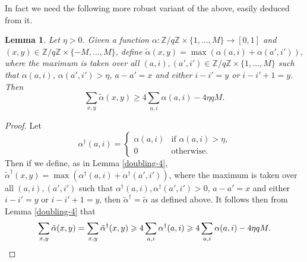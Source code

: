 \documentclass[10pt,reqno]{amsart}
\newtheorem{lemma}[theorem]{Lemma}
\theoremstyle{definition}
\theoremstyle{remark}
\renewcommand{\geq}{\geqslant}
\def\Z{\mathbb{Z}}
\numberwithin{equation}{section}
\begin{document}
In fact we need the following more robust variant of the above, easily deduced from it.

\begin{lemma}\label{doubling-4-witheps}
Let $\eta>0$. Given a function $\alpha : \Z/q\Z \times\{1,\dots,M\} \to [0,1]$ and $(x,y) \in \Z/q\Z\times \{-M,\dots, M\}$, define $\tilde \alpha(x,y) = \max (\alpha(a,i) + \alpha(a',i'))$, where the maximum is taken over all $(a,i), (a',i')\in\Z/q\Z\times\{1,\dots,M\}$ such that $\alpha(a,i)$, $\alpha(a',i')>\eta$, $a-a' = x$ and either $i-i' = y$ or $i - i' + 1 = y$. Then
\[ \sum_{x,y} \tilde \alpha(x,y) \geq 4 \sum_{a,i} \alpha(a,i) - 4\eta qM.\]
\end{lemma}
\begin{proof}
Let \[\alpha^\dag(a,i) = \begin{cases}\alpha(a,i) & \text{if $\alpha(a,i)>\eta$,}\\ 0 &\text{otherwise.}\end{cases}\] Then if we define, as in Lemma \ref{doubling-4}, $\tilde\alpha^\dag(x,y) = \max(\alpha^\dag(a,i) + \alpha^\dag(a',i'))$, where the maximum is taken over all $(a,i), (a',i')$ such that $\alpha^{\dag}(a,i), \alpha^{\dag}(a',i') > 0$, $a - a' = x$ and either $i - i' = y$ or $i - i' + 1 = y$, then $\tilde\alpha^\dag = \tilde\alpha$ as defined above. It follows then from Lemma \ref{doubling-4} that \[\sum_{x,y} \tilde\alpha(x,y) = \sum_{x,y} \tilde\alpha^\dag(x,y) \geq 4\sum_{a,i} \alpha^\dag(a,i) \geq 4\sum_{a,i}\alpha(a,i) - 4\eta qM.\qedhere\]
\end{proof}
\end{document}
